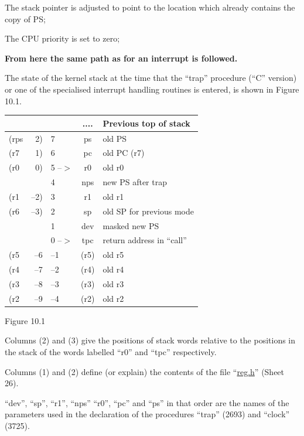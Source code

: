 \item[0772:] The stack pointer is adjusted to
 point to the location which
 already contains the copy of PS;

\item[0773:] The CPU priority is set to zero;

{\bf From here the same path as for an
interrupt is followed.}
\ed



The state of the kernel stack at the
time that the ``trap'' procedure (``C''
version) or one of the specialised
interrupt handling routines is entered,
is shown in Figure 10.1.

\begin{center}
\begin{tabular}{lrl|c|l}
 & & & .... & {\bf Previous top of stack} \\ \hline
(rps & 2)  & 7      & ps   & old PS \\
(r7  & 1)  & 6      & pc   & old PC (r7) \\
(r0  & 0)  & 5 --$>$ & r0   & old r0 \\
     &     & 4      & nps  & new PS after trap \\
(r1  & --2) & 3      & r1   & old r1 \\
(r6  & --3) & 2      & sp   & old SP for previous mode \\
     &     & 1      & dev  & masked new PS \\
     &     & 0 --$>$ & tpc  & return address in ``call'' \\ \hline
(r5  & --6  & --1     & (r5) & old r5 \\
(r4  & --7  & --2     & (r4) & old r4 \\
(r3  & --8  & --3     & (r3) & old r3 \\
(r2  & --9  & --4     & (r2) & old r2 \\
\end{tabular}
\bigskip

Figure 10.1
\end{center}

Columns (2) and (3) give the positions
of stack words relative to the positions in the stack of the words
labelled ``r0'' and ``tpc'' respectively.

Columns (1) and (2) define (or explain)
the contents of the file ``\href{./v6/reg.h}{reg.h}'' (Sheet 26).

``dev'', ``sp'', ``r1'', ``nps'' ``r0'', ``pc'' and
``ps'' in that order are the names of the
parameters used in the declaration of
the procedures ``trap'' (2693) and
``clock'' (3725).

